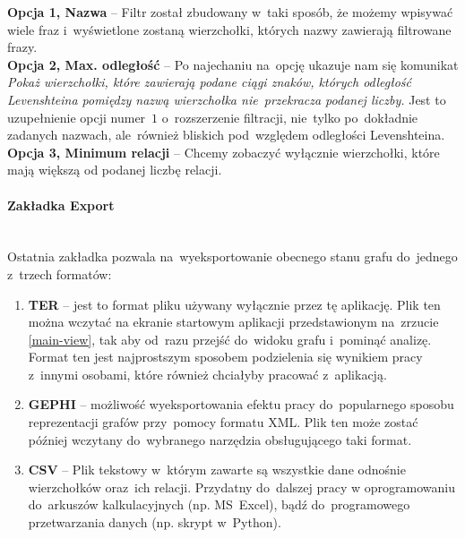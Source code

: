 \documentclass[12pt, a4paper]{article}
\newcommand{\subsubsubsection}[1]{\paragraph{#1}\mbox{}\\}
\begin{document}
\noindent \textbf{Opcja 1, Nazwa} --  Filtr został zbudowany w~taki sposób, że możemy wpisywać wiele fraz i~wyświetlone zostaną wierzchołki, których nazwy zawierają filtrowane frazy.\\

\noindent \textbf{Opcja 2, Max. odległość} -- Po najechaniu na~opcję ukazuje nam się komunikat \textit{Pokaż wierzchołki, które zawierają podane ciągi znaków, których odległość Levenshteina pomiędzy nazwą wierzchołka nie~przekracza podanej liczby.} Jest to uzupełnienie opcji numer~$1$ o~rozszerzenie filtracji, nie~tylko po~dokładnie zadanych nazwach, ale~również bliskich pod~względem odległości Levenshteina.\\

\noindent \textbf{Opcja 3, Minimum relacji} -- Chcemy zobaczyć wyłącznie wierzchołki, które mają większą od podanej liczbę relacji.

\subsubsubsection{Zakładka Export}

Ostatnia zakładka pozwala na~wyeksportowanie obecnego stanu grafu do~jednego z~trzech formatów:

\begin{enumerate}
  \item \textbf{TER} -- jest to format pliku używany wyłącznie przez tę aplikację. Plik ten można wczytać na ekranie startowym aplikacji przedstawionym na~zrzucie \ref{main-view}, tak aby od~razu przejść do~widoku grafu i~pominąć analizę. Format ten jest najprostszym sposobem podzielenia się wynikiem pracy z~innymi osobami, które również chciałyby pracować z~aplikacją.
  \item \textbf{GEPHI} -- możliwość wyeksportowania efektu pracy do~popularnego sposobu reprezentacji grafów przy~pomocy formatu XML. Plik ten może zostać później wczytany do~wybranego narzędzia obsługującego taki format.
  \item \textbf{CSV} -- Plik tekstowy w~którym zawarte są wszystkie dane odnośnie wierzchołków oraz~ich relacji. Przydatny do~dalszej pracy w oprogramowaniu do~arkuszów kalkulacyjnych (np. MS~Excel), bądź do~programowego przetwarzania danych (np. skrypt w~Python).
\end{enumerate}
\end{document}
